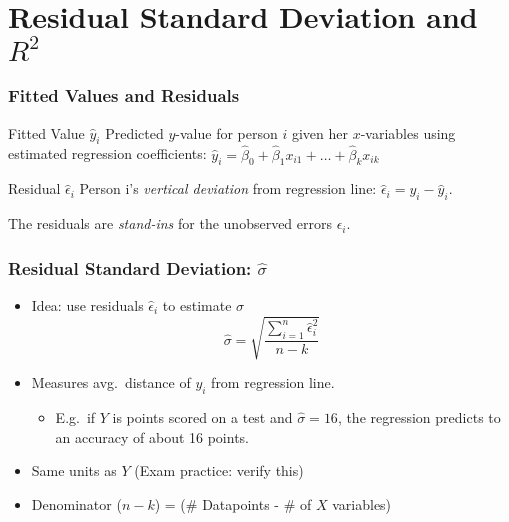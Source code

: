 \section{Residual Standard Deviation and $R^2$}

\begin{frame}
\frametitle{Fitted Values and Residuals}

\begin{block}{Fitted Value $\widehat{y}_i$}
Predicted $y$-value for person $i$ given her $x$-variables using estimated regression coefficients: \alert{$\widehat{y}_i = \widehat{\beta}_0 + \widehat{\beta}_1 x_{i1} + \hdots + \widehat{\beta}_k x_{ik}$}
\end{block}


\begin{block}{Residual $\widehat{\epsilon}_i$}
  Person i's \emph{vertical deviation} from regression line: \alert{$\widehat{\epsilon}_i = y_i - \widehat{y}_i$}. 
\end{block}

\vspace{1em}
\alert{The residuals are \emph{stand-ins} for the unobserved errors $\epsilon_i$.}

\end{frame}
\begin{frame}
\frametitle{Residual Standard Deviation: $\widehat{\sigma}$}
	\begin{itemize}
    \item Idea: use residuals $\widehat{\epsilon}_i$ to estimate $\sigma$
	$$\widehat{\sigma}  = \sqrt{\frac{\sum_{i=1}^n \widehat{\epsilon}_i^2}{n -k}}$$ 
		\item Measures avg.\ distance of $y_i$ from regression line.
				\begin{itemize}
					\item E.g.\ if $Y$ is points scored on a test and $\widehat{\sigma}=16$, the regression predicts to an accuracy of about 16 points. 
				\end{itemize}
	\item Same units as $Y$ (Exam practice: verify this) 
	\item Denominator  ($n-k$) = (\# Datapoints - \# of $X$ variables) 
	\end{itemize}

\end{frame}




